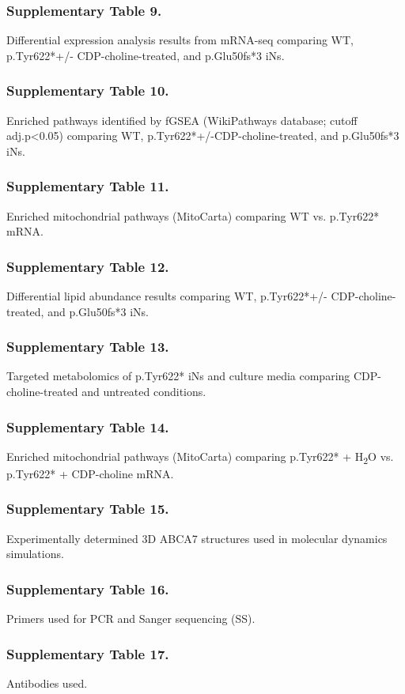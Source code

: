 \subsubsection{Supplementary Table 9.} 
Differential expression analysis results from mRNA-seq comparing WT, p.Tyr622*+/- CDP-choline-treated, and p.Glu50fs*3 iNs.\newline
\subsubsection{Supplementary Table 10.} 
Enriched pathways identified by fGSEA (WikiPathways database; cutoff adj.p<0.05) comparing WT, p.Tyr622*+/-CDP-choline-treated, and p.Glu50fs*3 iNs.\newline
\subsubsection{Supplementary Table 11.} 
Enriched mitochondrial pathways (MitoCarta) comparing WT vs. p.Tyr622* mRNA.\newline
\subsubsection{Supplementary Table 12.} 
Differential lipid abundance results comparing WT, p.Tyr622*+/- CDP-choline-treated, and p.Glu50fs*3 iNs.\newline
\subsubsection{Supplementary Table 13.} 
Targeted metabolomics of p.Tyr622* iNs and culture media comparing CDP-choline-treated and untreated conditions.\newline
\subsubsection{Supplementary Table 14.} 
Enriched mitochondrial pathways (MitoCarta) comparing p.Tyr622* + H\textsubscript{2}O vs. p.Tyr622* + CDP-choline mRNA.\newline
\subsubsection{Supplementary Table 15.} 
Experimentally determined 3D ABCA7 structures used in molecular dynamics simulations.\newline
\subsubsection{Supplementary Table 16.} 
Primers used for PCR and Sanger sequencing (SS).\newline
\subsubsection{Supplementary Table 17.} 
Antibodies used.\newline


